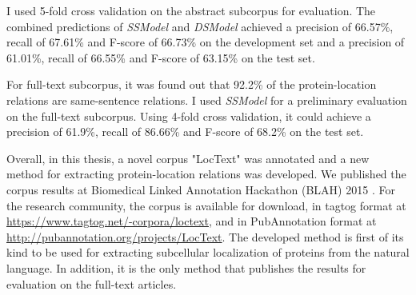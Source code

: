 I used 5-fold cross validation on the abstract subcorpus for evaluation. The combined predictions of \textit{SSModel} and \textit{DSModel} achieved a precision of 66.57\%, recall of 67.61\% and F-score of 66.73\% on the development set and a precision of 61.01\%, recall of 66.55\% and F-score of 63.15\% on the test set.

For full-text subcorpus, it was found out that 92.2\% of the protein-location relations are same-sentence relations. I used \textit{SSModel} for a preliminary evaluation on the full-text subcorpus. Using 4-fold cross validation, it could achieve a precision of 61.9\%, recall of 86.66\% and F-score of 68.2\% on the test set.

Overall, in this thesis, a novel corpus "LocText" was annotated and a new method for extracting protein-location relations was developed. We published the corpus results \cite{goldberg2015linked} at Biomedical Linked Annotation Hackathon (BLAH) 2015 \cite{blah}. For the research community, the corpus is available for download, in tagtog format at \url{https://www.tagtog.net/-corpora/loctext}, and in PubAnnotation format at \url{http://pubannotation.org/projects/LocText}. The developed method is first of its kind to be used for extracting subcellular localization of proteins from the natural language. In addition, it is the only method that publishes the results for evaluation on the full-text articles.

